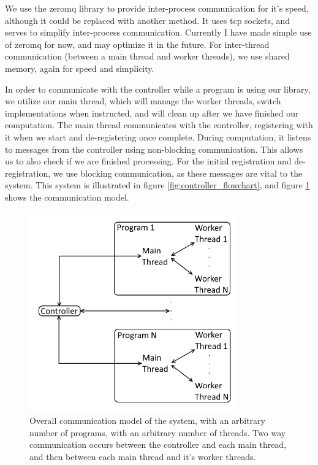 We use the zeromq library to provide inter-process communication for it's speed, although it could be replaced with another method. It uses tcp sockets, and serves to simplify inter-process communication. Currently I have made simple use of zeromq for now, and may optimize it in the future. For inter-thread communication (between a main thread and worker threads), we use shared memory, again for speed and simplicity.

In order to communicate with the controller while a program is using our library, we utilize our main thread, which will manage the worker threads, switch implementations when instructed, and will clean up after we have finished our computation. The main thread communicates with the controller, registering with it when we start and de-registering once complete. During computation, it listens to messages from the controller using non-blocking communication. This allows us to also check if we are finished processing. For the initial registration and de-registration, we use blocking communication, as these messages are vital to the system. This system is illustrated in figure \ref{fig:controller_flowchart}, and figure \ref{fig:communication_structure} shows the communication model.

\begin{figure}
	\centering
	\includegraphics[width=0.8\textwidth]{graphics/communication_structure.png}
	\caption{Overall communication model of the system, with an arbitrary number of programs, with an arbitrary number of threads. Two way communication occurs between the controller and each main thread, and then between each main thread and it's worker threads.}
	\label{fig:communication_structure}
\end{figure}



